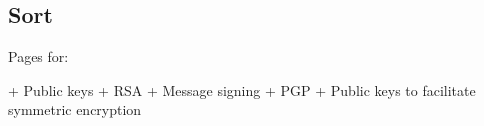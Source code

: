 
\subsection{Sort}


Pages for:

+ Public keys
+ RSA
+ Message signing
+ PGP
+ Public keys to facilitate symmetric encryption

